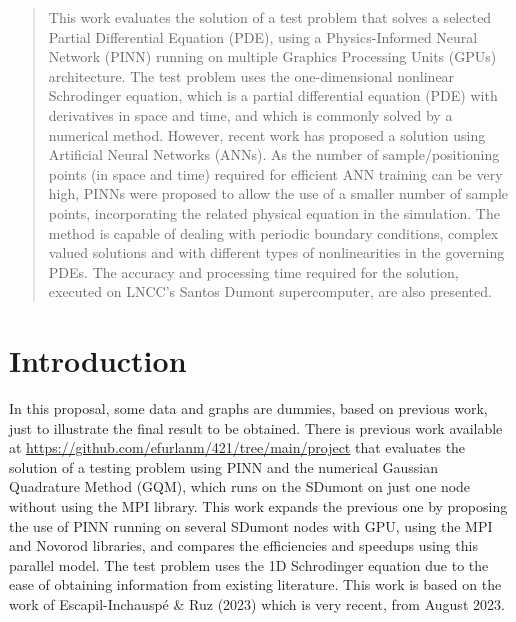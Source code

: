 \documentclass[conference]{IEEEtran}
\begin{document}
\begin{abstract}
This work evaluates the solution of a test problem that solves a selected Partial Differential Equation (PDE), using a Physics-Informed Neural Network (PINN) running on multiple Graphics Processing Units (GPUs) architecture. The test problem uses the one-dimensional nonlinear Schrodinger equation, which is a partial differential equation (PDE) with derivatives in space and time, and which is commonly solved by a numerical method. However, recent work has proposed a solution using Artificial Neural Networks (ANNs). As the number of sample/positioning points (in space and time) required for efficient ANN training can be very high, PINNs were proposed to allow the use of a smaller number of sample points, incorporating the related physical equation in the simulation. The method is capable of dealing with periodic boundary conditions, complex valued solutions and with different types of nonlinearities in the governing PDEs. The accuracy and processing time required for the solution, executed on LNCC's Santos Dumont supercomputer, are also presented.
\end{abstract}


%
%
%
\section{Introduction}
%

In this proposal, some data and graphs are dummies, based on previous work, just to illustrate the final result to be obtained. There is previous work available at \url{https://github.com/efurlanm/421/tree/main/project} that evaluates the solution of a testing problem using PINN and the numerical Gaussian Quadrature Method (GQM), which runs on the SDumont on just one node without using the MPI library. This work expands the previous one by proposing the use of PINN running on several SDumont nodes with GPU, using the MPI and Novorod libraries, and compares the efficiencies and speedups using this parallel model. The test problem uses the 1D Schrodinger equation due to the ease of obtaining information from existing literature. This work is based on the work of Escapil-Inchauspé \& Ruz (2023) \cite{Escapil} which is very recent, from August 2023.
\end{document}
